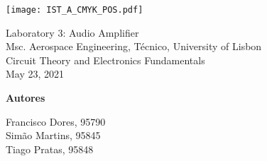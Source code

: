 \thispagestyle {empty}

\begin{titlepage}
\texttt{[image: IST\_A\_CMYK\_POS.pdf]}

\begin{center}
%
\vspace{1.0cm}

\vspace{5cm}
{\FontLb Laboratory 3: Audio Amplifier} \\
\vspace{1cm}
{\FontSn Msc. Aerospace Engineering, Técnico, University of Lisbon} \\
\vspace{1cm}
{\FontSn Circuit Theory and Electronics Fundamentals} \\
\vspace{1cm}
{\FontSn May 23, 2021} \\


\vspace{8cm}


\textbf{{Autores}\\[0.06in]}

Francisco Dores, 95790\\
Simão Martins, 95845\\
Tiago Pratas, 95848\\ 
\vspace{2cm}

\end{center}

\end{titlepage}

